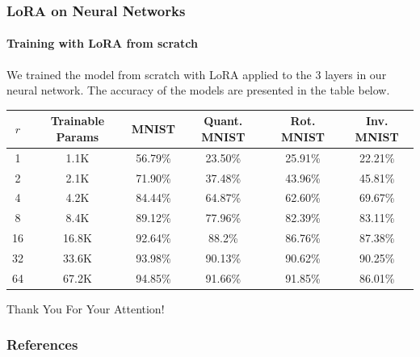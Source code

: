 \documentclass{beamer}
\newcommand\Tstrut{\rule{0pt}{2.6ex}}
\begin{document}
    \begin{frame}
        \frametitle{LoRA on Neural Networks}
        \framesubtitle{Training with LoRA from scratch}
        We trained the model from scratch with LoRA applied to the 3 layers in our neural network. The accuracy  of the models are presented in the table below.
        \begin{center}
            \small %
            \setlength{\tabcolsep}{1pt} %
            \renewcommand{\arraystretch}{1.2} %
            \begin{tabular}{c | c | c | c | c | c}
                \hspace{0.1cm}$r$\hspace{0.1cm} & \hspace{0.1cm}Trainable Params\hspace{0.1cm} & \hspace{0.1cm}MNIST\hspace{0.1cm} & \hspace{0.1cm}Quant. MNIST\hspace{0.1cm} & \hspace{0.1cm}Rot. MNIST\hspace{0.1cm} & \hspace{0.1cm}Inv. MNIST \\
                \hline
                1 & 1.1K & 56.79\% & 23.50\% & 25.91\% & 22.21\% \Tstrut \\
                2 & 2.1K & 71.90\% & 37.48\% & 43.96\% & 45.81\% \\
                4 & 4.2K & 84.44\% & 64.87\% & 62.60\% & 69.67\% \\
                8 & 8.4K & 89.12\% & 77.96\% & 82.39\% & 83.11\% \\
                16 & 16.8K & 92.64\% & 88.2\% & 86.76\% & 87.38\% \\
                32 & 33.6K & 93.98\% & 90.13\% & 90.62\% & 90.25\% \\
                64 & 67.2K & 94.85\% & 91.66\% & 91.85\% & 86.01\%
            \end{tabular}
        \end{center}               
    \end{frame}

    \begin{frame}
        \centering Thank You For Your Attention!
    \end{frame}
    
    \begin{frame}
      \frametitle{References}
      \nocite{*}
      \printbibliography
      \vspace{10cm}
    \end{frame}
    
    
    
\end{document}

